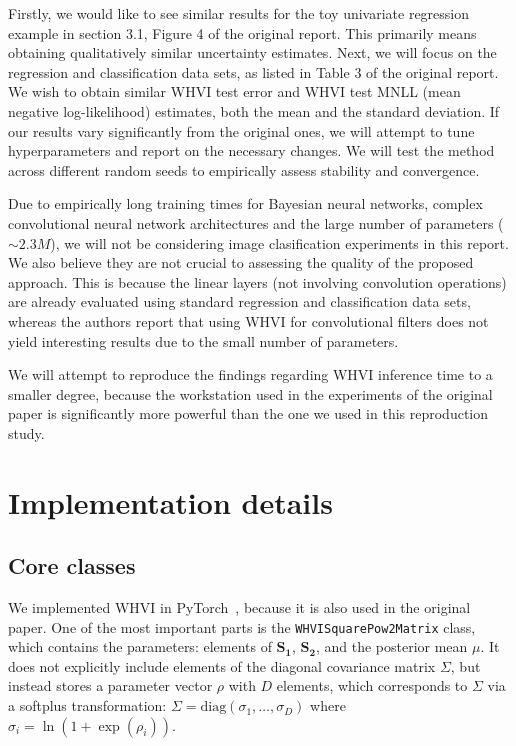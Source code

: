 \documentclass[11pt]{article}
\begin{document}
    Firstly, we would like to see similar results for the toy univariate regression example in section 3.1, Figure 4 of the original report.
    This primarily means obtaining qualitatively similar uncertainty estimates.
    Next, we will focus on the regression and classification data sets, as listed in Table 3 of the original report.
    We wish to obtain similar WHVI test error and WHVI test MNLL (mean negative log-likelihood) estimates, both the mean and the standard deviation.
    If our results vary significantly from the original ones, we will attempt to tune hyperparameters and report on the necessary changes.
    We will test the method across different random seeds to empirically assess stability and convergence.

    Due to empirically long training times for Bayesian neural networks, complex convolutional neural network architectures and the large number of parameters ($\sim 2.3M$), we will not be considering image clasification experiments in this report.
    We also believe they are not crucial to assessing the quality of the proposed approach.
    This is because the linear layers (not involving convolution operations) are already evaluated using standard regression and classification data sets, whereas the authors report that using WHVI for convolutional filters does not yield interesting results due to the small number of parameters.

    We will attempt to reproduce the findings regarding WHVI inference time to a smaller degree, because the workstation used in the experiments of the original paper is significantly more powerful than the one we used in this reproduction study.

    \section{Implementation details}\label{sec:implementation-details}
    \subsection{Core classes}\label{subsec:core-classes}
    We implemented WHVI in PyTorch~\cite{pytorch}, because it is also used in the original paper.
    One of the most important parts is the \texttt{WHVISquarePow2Matrix} class, which contains the parameters: elements of $\mathbf{S_1}$, $\mathbf{S_2}$, and the posterior mean $\mu$.
    It does not explicitly include elements of the diagonal covariance matrix $\Sigma$, but instead stores a parameter vector $\rho$ with $D$ elements, which corresponds to $\Sigma$ via a softplus transformation: $\Sigma = \mathrm{diag}(\sigma_1, \dots, \sigma_D)$ where $\sigma_i = \ln(1 + \exp(\rho_i))$.
\end{document}
